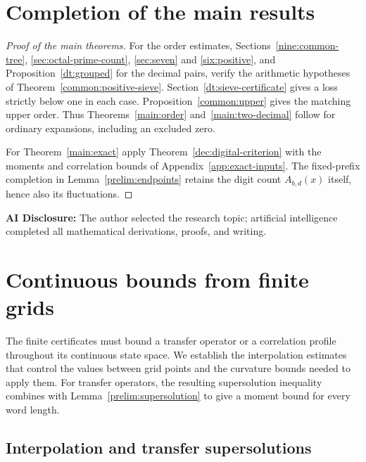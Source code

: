\documentclass[11pt,a4paper]{article}
\theoremstyle{paperplain}
\numberwithin{equation}{section}
\begin{document}
\clearpage
\section{Completion of the main results}
\label{sec:completion}

\begin{proof}[Proof of the main theorems]
For the order estimates, Sections~\ref{nine:common-tree},
\ref{sec:octal-prime-count}, \ref{sec:seven} and \ref{six:positive},
and Proposition~\ref{dt:grouped} for the decimal pairs, verify the
arithmetic hypotheses of Theorem~\ref{common:positive-sieve}.
Section~\ref{dt:sieve-certificate} gives a loss strictly below one in
each case. Proposition~\ref{common:upper} gives the matching upper
order. Thus Theorems~\ref{main:order} and~\ref{main:two-decimal}
follow for ordinary expansions, including an excluded zero.

For Theorem~\ref{main:exact} apply Theorem~\ref{dec:digital-criterion}
with the moments and correlation bounds of Appendix~\ref{app:exact-inputs}.
The fixed-prefix completion in Lemma~\ref{prelim:endpoints} retains
the digit count $A_{b,d}(x)$ itself, hence also its fluctuations.
\end{proof}

\bigskip
\noindent\textbf{AI Disclosure:} The author selected the research topic; artificial intelligence completed all mathematical derivations, proofs, and writing.

\appendix
{}
\section{Continuous bounds from finite grids}\label{app:continuous}

The finite certificates must bound a transfer operator or a correlation
profile throughout its continuous state space. We establish the
interpolation estimates that control the values between grid points and
the curvature bounds needed to apply them. For transfer operators, the
resulting supersolution inequality combines with
Lemma~\ref{prelim:supersolution} to give a moment bound for every word length.

\subsection{Interpolation and transfer supersolutions}
\end{document}
